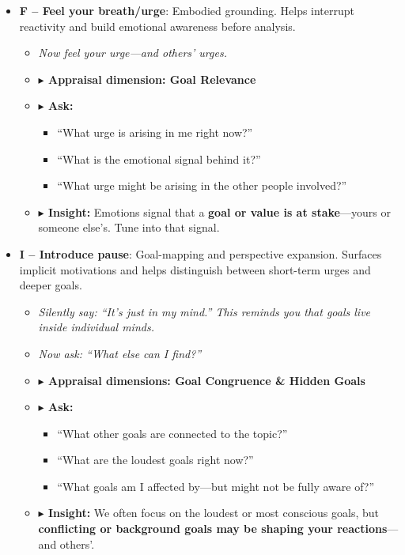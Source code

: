 \documentclass{article}
\begin{document}
\begin{itemize}[noitemsep,topsep=0pt]
    \item \textbf{F – Feel your breath/urge}: Embodied grounding. Helps interrupt reactivity and build emotional awareness before analysis.
    \begin{itemize}[noitemsep,topsep=0pt]
        \item \textit{Now feel your urge—and others’ urges.}
        \item \textbf{$\blacktriangleright$ Appraisal dimension: Goal Relevance}
        \item \textbf{$\blacktriangleright$ Ask:}
        \begin{itemize}[noitemsep,topsep=0pt]
            \item “What urge is arising in me right now?”
            \item “What is the emotional signal behind it?”
            \item “What urge might be arising in the other people involved?”
        \end{itemize}
        \item \textbf{$\blacktriangleright$ Insight:} Emotions signal that a \textbf{goal or value is at stake}—yours or someone else's. Tune into that signal.
    \end{itemize}

    \item \textbf{I – Introduce pause}: Goal-mapping and perspective expansion. Surfaces implicit motivations and helps distinguish between short-term urges and deeper goals.
    \begin{itemize}[noitemsep,topsep=0pt]
        \item \textit{Silently say: “It’s just in my mind.” This reminds you that goals live inside individual minds.}
        \item \textit{Now ask: “What else can I find?”}
        \item \textbf{$\blacktriangleright$ Appraisal dimensions: Goal Congruence \& Hidden Goals}
        \item \textbf{$\blacktriangleright$ Ask:}
        \begin{itemize}[noitemsep,topsep=0pt]
            \item “What other goals are connected to the topic?”
            \item “What are the loudest goals right now?”
            \item “What goals am I affected by—but might not be fully aware of?”
        \end{itemize}
        \item \textbf{$\blacktriangleright$ Insight:} We often focus on the loudest or most conscious goals, but \textbf{conflicting or background goals may be shaping your reactions}—and others’.
    \end{itemize}


\end{itemize}
\end{document}
